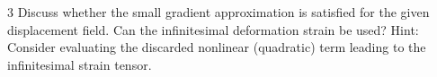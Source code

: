 
  \begin{problem}{3}
    Discuss whether the small gradient approximation is satisfied for the given displacement field.
    Can the infinitesimal deformation strain be used?
    Hint: Consider evaluating the discarded nonlinear (quadratic) term leading to the infinitesimal strain tensor.
  \end{problem}

